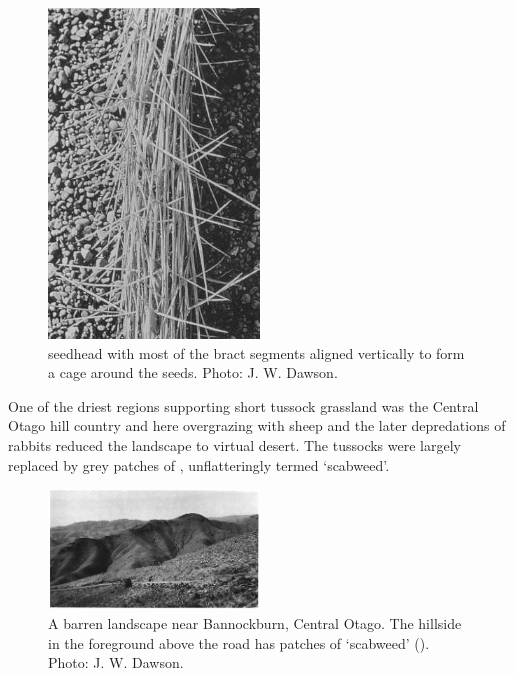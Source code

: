 \begin{figure}
	\includegraphics[width=0.5\textwidth]{graphics/figure85aciphylla-seedhead.jpg}
	\centering
	\caption[Aciphylla subflabellata seedhead]{ seedhead with most of the bract segments aligned vertically to form a cage around the seeds.
    Photo:  J. W. Dawson.}
	\label{fig:85aciphylla-seedhead}
\end{figure}

One of the driest regions supporting short tussock grassland was the Central Otago hill country and here overgrazing with sheep and the later depredations of rabbits reduced the landscape to virtual desert.
The tussocks were largely replaced by grey patches of , unflatteringly termed `scabweed'.

\begin{figure}
	\includegraphics[width=0.5\textwidth]{graphics/figure86barren.jpg}
	\centering
	\caption[A barren landscape near Bannockburn]{A barren landscape near Bannockburn, Central Otago.
    The hillside in the foreground above the road has patches of `scabweed' ().
    Photo:  J. W. Dawson.}
	\label{fig:86barren}
\end{figure}

